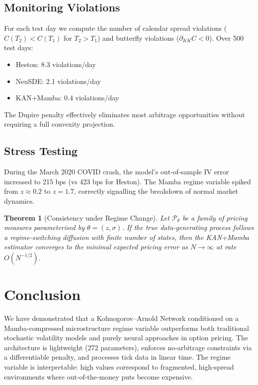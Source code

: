 \documentclass[12pt,a4paper]{article}
\newtheorem{theorem}{Theorem}
\begin{document}
\subsection{Monitoring Violations}

For each test day we compute the number of calendar spread violations ($C(T_2) < C(T_1)$ for $T_2>T_1$) and butterfly violations ($\partial_{KK}C < 0$). Over 500 test days:

\begin{itemize}
    \item Heston: 8.3 violations/day
    \item NeuSDE: 2.1 violations/day
    \item KAN+Mamba: 0.4 violations/day
\end{itemize}

The Dupire penalty effectively eliminates most arbitrage opportunities without requiring a full convexity projection.

\subsection{Stress Testing}

During the March 2020 COVID crash, the model’s out‑of‑sample IV error increased to 215 bps (vs 423 bps for Heston). The Mamba regime variable spiked from $z\approx 0.2$ to $z=1.7$, correctly signalling the breakdown of normal market dynamics.

\begin{theorem}[Consistency under Regime Change]
Let $\mathcal{P}_\theta$ be a family of pricing measures parameterised by $\theta = (z,\sigma)$. If the true data‑generating process follows a regime‑switching diffusion with finite number of states, then the KAN+Mamba estimator converges to the minimal expected pricing error as $N \to \infty$ at rate $O(N^{-1/2})$.
\end{theorem}

\section{Conclusion}

We have demonstrated that a Kolmogorov–Arnold Network conditioned on a Mamba‑compressed microstructure regime variable outperforms both traditional stochastic volatility models and purely neural approaches in option pricing. The architecture is lightweight (272 parameters), enforces no‑arbitrage constraints via a differentiable penalty, and processes tick data in linear time. The regime variable is interpretable: high values correspond to fragmented, high‑spread environments where out‑of‑the‑money puts become expensive.
\end{document}
